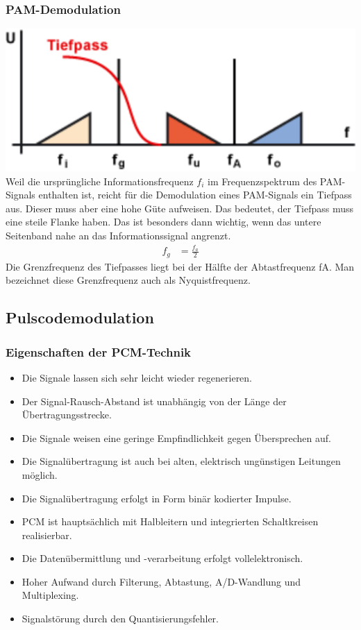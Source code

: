 \documentclass[a4paper,10pt]{article}
\begin{document}
\subsubsection{PAM-Demodulation}
\includegraphics[scale=0.5]{PAM-demodulation.png}\\
Weil die ursprüngliche Informationsfrequenz $f_i$ im Frequenzspektrum des PAM-Signals enthalten ist, reicht für die Demodulation eines PAM-Signals ein Tiefpass aus.
Dieser muss aber eine hohe Güte aufweisen. Das bedeutet, der Tiefpass muss eine steile Flanke haben. Das ist besonders dann wichtig, wenn das untere Seitenband
nahe an das Informationssignal angrenzt.
\begin{align}
 f_g &= \frac{f_a}{2}
\end{align}
Die Grenzfrequenz des Tiefpasses liegt bei der Hälfte der Abtastfrequenz fA. Man bezeichnet diese Grenzfrequenz auch als Nyquistfrequenz.


\subsection{Pulscodemodulation}

\subsubsection{Eigenschaften der PCM-Technik}
 \begin{itemize}
 \item Die Signale lassen sich sehr leicht wieder regenerieren.
 \item Der Signal-Rausch-Abstand ist unabhängig von der Länge der Übertragungsstrecke.
 \item Die Signale weisen eine geringe Empfindlichkeit gegen Übersprechen auf.
 \item Die Signalübertragung ist auch bei alten, elektrisch ungünstigen Leitungen möglich.
 \item Die Signalübertragung erfolgt in Form binär kodierter Impulse.
 \item PCM ist hauptsächlich mit Halbleitern und integrierten Schaltkreisen realisierbar.
 \item Die Datenübermittlung und -verarbeitung erfolgt vollelektronisch.
 \item Hoher Aufwand durch Filterung, Abtastung, A/D-Wandlung und Multiplexing.
 \item Signalstörung durch den Quantisierungsfehler.
\end{itemize}
\end{document}

